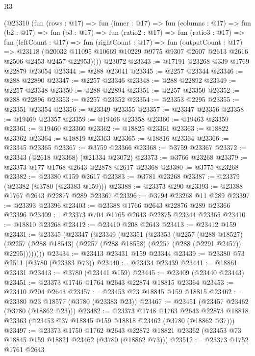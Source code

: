 \begin{lexlean}{R3}
\begin{coremodule}
      (@23310
        (fun (rows : @17) =>
        fun (inner : @17) =>
        fun (columns : @17) =>
        fun (b2 : @17) =>
        fun (b3 : @17) =>
        fun (ratio2 : @17) =>
        fun (ratio3 : @17) =>
        fun (leftCount : @17) =>
        fun (rightCount : @17) =>
        fun (outputCount : @17) =>
        @23118
          (@20032 @11095 @10669 @10229 @9775 @9307 @2607 @2613 @2616 @2506 @2453 @2457 @22953))))
    @23072
@23343 := @17191 @23268 @339 @1769 @22879 @23054
@23344 := @288 @23041
@23345 := @2257 @23344
@23346 := @288 @22890
@23347 := @2257 @23346
@23348 := @288 @22892
@23349 := @2257 @23348
@23350 := @288 @22894
@23351 := @2257 @23350
@23352 := @288 @22896
@23353 := @2257 @23352
@23354 := @23353 @2295
@23355 := @23351 @23354
@23356 := @23349 @23355
@23357 := @23347 @23356
@23358 := @19469 @23357
@23359 := @19466 @23358
@23360 := @19463 @23359
@23361 := @19460 @23360
@23362 := @18825 @23361
@23363 := @18822 @23362
@23364 := @18819 @23363
@23365 := @18816 @23364
@23366 := @23345 @23365
@23367 := @3759 @23366
@23368 := @3759 @23367
@23372 := @23343 (@2618 @23368) (@21334 @23072)
@23373 := @3766 @23268
@23379 := @23373 @177 @1768 @2643 @22878 @2617 @23368
@23380 := @3775 @23268
@23382 := @23380 @159 @2617
@23383 := @3781 @23268
@23387 := @23379 (@23382 (@3780 (@23383 @159)))
@23388 := @23373 @290
@23393 := @23388 @1767 @2643 @22877 @289 @23367
@23396 := @3794 @23268 @11 @289
@23397 := @23393 @23396
@23403 := @23388 @1766 @2643 @22876 @289 @23366 @23396
@23409 := @23373 @704 @1765 @2643 @22875 @23344 @23365
@23410 := @18810 @23268
@23412 := @23410 @208 @2643
@23413 := @23412 @159
@23431 := @23345
    (@23347
      (@23349
        (@23351
          (@23353
            (@2257
              (@288 @18527)
              (@2257 (@288 @18543) (@2257 (@288 @18558) (@2257 (@288 (@2291 @2457)) @2295))))))))
@23434 := @23413 @23431 @159 @23344
@23439 := @23380 @73 @2511 (@3780 (@23383 @73))
@23440 := @23434 @23439
@23441 := @18861 @23431
@23443 := @3780 (@23441 @159)
@23445 := @23409 (@23440 @23443)
@23451 := @23373 @1746 @1764 @2643 @22874 @18815 @23364
@23453 := @23410 @204 @2643
@23457 := @23453 @23 @18845 @159 @18815
@23462 := @23380 @23 @18577 (@3780 (@23383 @23))
@23467 := @23451 (@23457 @23462 (@3780 (@18862 @23)))
@23482 := @23373
    @1748
    @1763
    @2643
    @22873
    @18818
    @23363
    (@23453 @37 @18845 @159 @18818 @23462 (@3780 (@18862 @37)))
@23497 := @23373
    @1750
    @1762
    @2643
    @22872
    @18821
    @23362
    (@23453 @73 @18845 @159 @18821 @23462 (@3780 (@18862 @73)))
@23512 := @23373
    @1752
    @1761
    @2643

\end{coremodule}
\end{lexlean}
